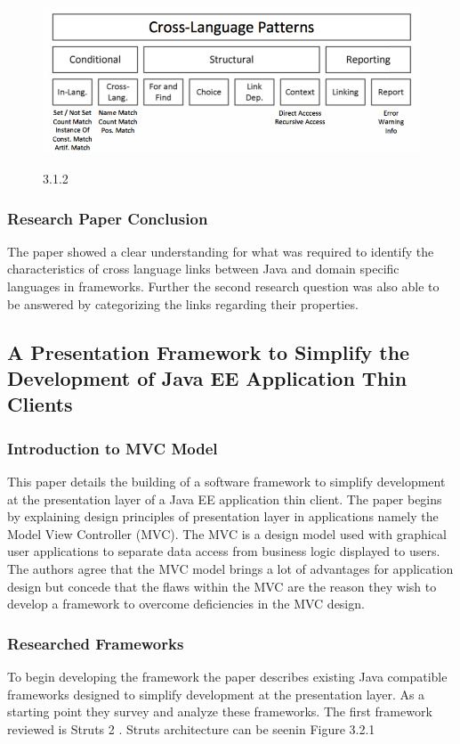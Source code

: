 \documentclass{article}
\begin{document}
			\begin{figure}[!htb]
				\includegraphics[width=.8\textwidth]{img2.png}
				\begin{center}
					\figurename{ 3.1.2}
				\end{center}
			\end{figure}

		\subsubsection{Research Paper Conclusion}
		The paper showed a clear understanding for what was required to identify the characteristics of cross language links between Java and domain specific languages in frameworks. Further the second research question was also able to be answered by categorizing the links regarding their properties. 

	\subsection{A Presentation Framework to Simplify the Development of Java EE Application Thin Clients}
	
		\subsubsection{Introduction to MVC Model}
		This paper details the building of a software framework to simplify development at the presentation layer of a Java EE application thin client. The paper begins by explaining design principles of presentation layer in applications namely the Model View Controller (MVC). The MVC is a design model used with graphical user applications to separate data access from business logic displayed to users. The authors agree that the MVC model brings a lot of advantages for application design but concede that the flaws within the MVC are the reason they wish to develop a framework to overcome deficiencies in the MVC design.
	
		\subsubsection{Researched Frameworks}
		To begin developing the framework the paper describes existing Java compatible frameworks designed to simplify development at the presentation layer. As a starting point they survey and analyze these frameworks. The first framework reviewed is Struts 2 \cite{struts}. Struts architecture can be seenin Figure 3.2.1 
				
\end{document}
